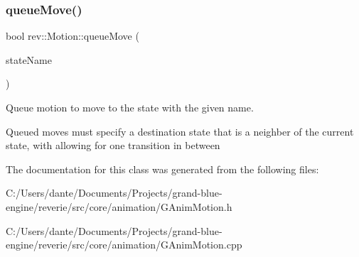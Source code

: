 \subsubsection{\texorpdfstring{queueMove()}{queueMove()}}
{\footnotesize\ttfamily bool rev\+::\+Motion\+::queue\+Move (\begin{DoxyParamCaption}\item[{const \mbox{\hyperlink{classrev_1_1_g_string_view}{G\+String\+View}} \&}]{state\+Name }\end{DoxyParamCaption})}



Queue motion to move to the state with the given name. 

Queued moves must specify a destination state that is a neighber of the current state, with allowing for one transition in between 

The documentation for this class was generated from the following files\+:\begin{DoxyCompactItemize}
\item 
C\+:/\+Users/dante/\+Documents/\+Projects/grand-\/blue-\/engine/reverie/src/core/animation/G\+Anim\+Motion.\+h\item 
C\+:/\+Users/dante/\+Documents/\+Projects/grand-\/blue-\/engine/reverie/src/core/animation/G\+Anim\+Motion.\+cpp\end{DoxyCompactItemize}
